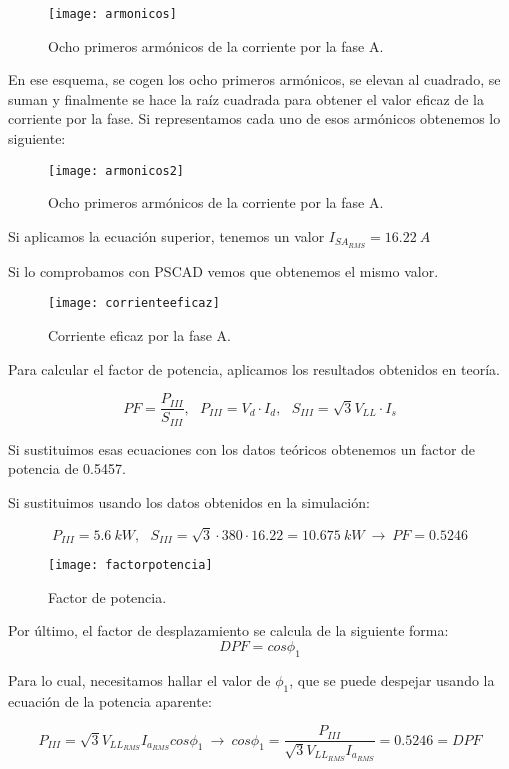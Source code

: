\documentclass[10pt]{article}
\begin{document}
	\begin{figure}[H]
		\begin{center}
			\texttt{[image: armonicos]}
		\end{center}\caption{Ocho primeros armónicos de la corriente por la fase A.}
	\end{figure}

	En ese esquema, se cogen los ocho primeros armónicos, se elevan al cuadrado, se suman y finalmente se hace la raíz cuadrada para obtener el valor eficaz de la corriente por la fase. Si representamos cada uno de esos armónicos obtenemos lo siguiente:
	
	\begin{figure}[H]
		\begin{center}
			\texttt{[image: armonicos2]}
		\end{center}\caption{Ocho primeros armónicos de la corriente por la fase A.}
	\end{figure}
	
	Si aplicamos la ecuación superior, tenemos un valor $I_{{SA}_{RMS}}= 16.22\ A$
	
	Si lo comprobamos con PSCAD vemos que obtenemos el mismo valor.
	
	\begin{figure}[H]
		\begin{center}
			\texttt{[image: corrienteeficaz]}
		\end{center}\caption{Corriente eficaz por la fase A.}
	\end{figure}

	Para calcular el factor de potencia, aplicamos los resultados obtenidos en teoría.
	
	$$PF=\frac{P_{III}}{S_{III}},\ \ \ P_{III} = V_d\cdot I_d,\ \ \ S_{III} = \sqrt{3}V_{LL}\cdot I_s$$
	
	Si sustituimos esas ecuaciones con los datos teóricos obtenemos un factor de potencia de 0.5457.
	
	Si sustituimos usando los datos obtenidos en la simulación:
	
	$$P_{III}=5.6\ kW,\ \ \ S_{III}=\sqrt{3}\cdot 380 \cdot 16.22 = 10.675\ kW\ \rightarrow\ PF=0.5246$$
	
	\begin{figure}[H]
		\begin{center}
			\texttt{[image: factorpotencia]}
		\end{center}\caption{Factor de potencia.}
	\end{figure}

	Por último, el factor de desplazamiento se calcula de la siguiente forma:
	$$DPF = cos \phi_1$$
	
	Para lo cual, necesitamos hallar el valor de $\phi_1$, que se puede despejar usando la ecuación de la potencia aparente:
	
	$$P_{III}=\sqrt{3}V_{{LL}_{RMS}}I_{a_{RMS}}cos\phi_1\ \rightarrow\ cos\phi_1=\frac{P_{III}}{\sqrt{3}V_{{LL}_{RMS}}I_{a_{RMS}}}=0.5246=DPF$$
\end{document}

